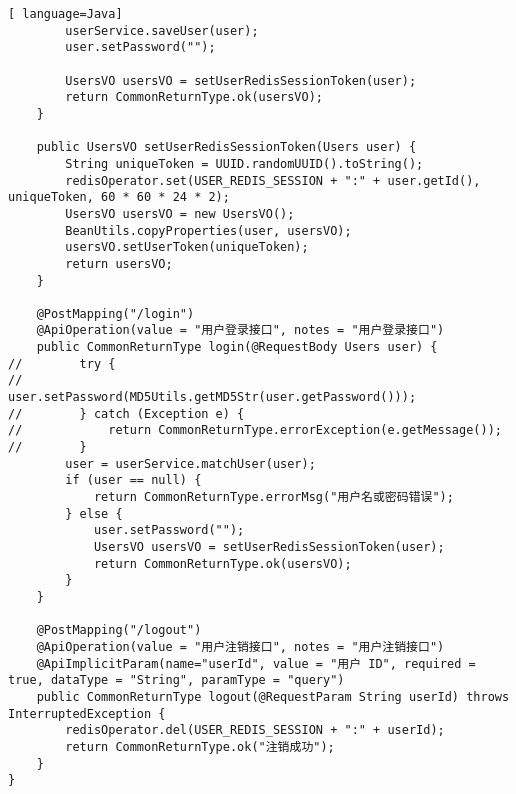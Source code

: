 \begin{lstlisting}[ language=Java]
        userService.saveUser(user);
        user.setPassword("");

        UsersVO usersVO = setUserRedisSessionToken(user);
        return CommonReturnType.ok(usersVO);
    }

    public UsersVO setUserRedisSessionToken(Users user) {
        String uniqueToken = UUID.randomUUID().toString();
        redisOperator.set(USER_REDIS_SESSION + ":" + user.getId(), uniqueToken, 60 * 60 * 24 * 2);
        UsersVO usersVO = new UsersVO();
        BeanUtils.copyProperties(user, usersVO);
        usersVO.setUserToken(uniqueToken);
        return usersVO;
    }

    @PostMapping("/login")
    @ApiOperation(value = "用户登录接口", notes = "用户登录接口")
    public CommonReturnType login(@RequestBody Users user) {
//        try {
//            user.setPassword(MD5Utils.getMD5Str(user.getPassword()));
//        } catch (Exception e) {
//            return CommonReturnType.errorException(e.getMessage());
//        }
        user = userService.matchUser(user);
        if (user == null) {
            return CommonReturnType.errorMsg("用户名或密码错误");
        } else {
            user.setPassword("");
            UsersVO usersVO = setUserRedisSessionToken(user);
            return CommonReturnType.ok(usersVO);
        }
    }

    @PostMapping("/logout")
    @ApiOperation(value = "用户注销接口", notes = "用户注销接口")
    @ApiImplicitParam(name="userId", value = "用户 ID", required = true, dataType = "String", paramType = "query")
    public CommonReturnType logout(@RequestParam String userId) throws InterruptedException {
        redisOperator.del(USER_REDIS_SESSION + ":" + userId);
        return CommonReturnType.ok("注销成功");
    }
}

\end{lstlisting}



